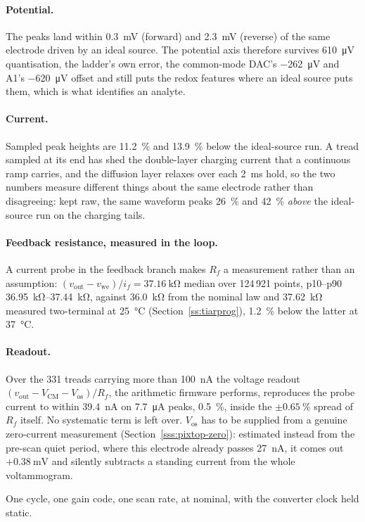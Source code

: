 \paragraph{Potential.} The peaks land within \SI{0.3}{\milli\volt} (forward) and
\SI{2.3}{\milli\volt} (reverse) of the same electrode driven by an ideal source.
The potential axis therefore survives \SI{610}{\micro\volt} quantisation, the
ladder's own error, the common-mode DAC's \SI{-262}{\micro\volt} and A1's
\SI{-620}{\micro\volt} offset and still puts the redox features where an ideal
source puts them, which is what identifies an analyte.

\paragraph{Current.} Sampled peak heights are \SI{11.2}{\percent} and
\SI{13.9}{\percent} below the ideal-source run. A tread sampled at its end has
shed the double-layer charging current that a continuous ramp carries, and the
diffusion layer relaxes over each \SI{2}{\milli\second} hold, so the two
numbers measure different things about the same electrode rather than
disagreeing: kept raw, the same waveform peaks \SI{26}{\percent} and
\SI{42}{\percent} \emph{above} the ideal-source run on the charging tails.

\paragraph{Feedback resistance, measured in the loop.} A current probe in the
feedback branch makes \(R_f\) a measurement rather than an assumption:
\((v_{\mathrm{out}} - v_{\mathrm{we}})/i_f = \SI{37.16}{\kilo\ohm}\) median over
124\,921 points, p10--p90 \SIrange{36.95}{37.44}{\kilo\ohm}, against
\SI{36.0}{\kilo\ohm} from the nominal law and \SI{37.62}{\kilo\ohm} measured
two-terminal at \SI{25}{\celsius} (Section~\ref{ss:tiarprog}),
\SI{1.2}{\percent} below the latter at \SI{37}{\celsius}.

\paragraph{Readout.} Over the 331 treads carrying more than
\SI{100}{\nano\ampere} the voltage readout
\((v_{\mathrm{out}} - V_{\mathrm{CM}} - V_{\mathrm{os}})/R_f\), the
arithmetic firmware performs, reproduces the probe current to within
\SI{39.4}{\nano\ampere} on \SI{7.7}{\micro\ampere} peaks, \SI{0.5}{\percent},
inside the \(\pm\SI{0.65}{\percent}\) spread of \(R_f\) itself. No systematic
term is left over. \(V_{\mathrm{os}}\) has to be supplied from a genuine
zero-current measurement (Section~\ref{sss:pixtop-zero}): estimated instead from
the pre-scan quiet period, where this electrode already passes
\SI{27}{\nano\ampere}, it comes out \(+\SI{0.38}{\milli\volt}\) and silently
subtracts a standing current from the whole voltammogram.

One cycle, one gain code, one scan rate, at nominal, with the converter clock
held static.
